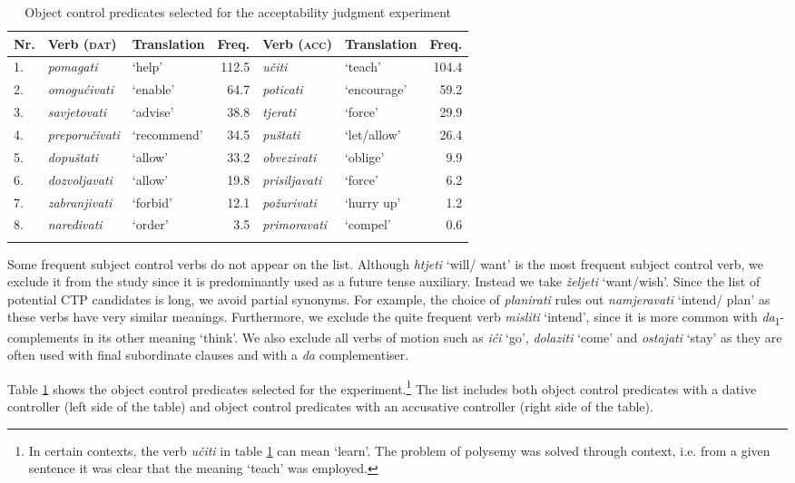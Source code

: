 \begin{table}[b]
\caption{Object control predicates selected for the acceptability judgment experiment\label{T16.3}}
\begin{tabular}{l@{~}llrllr}
\lsptoprule
Nr.&Verb (\textsc{dat})&Translation&Freq.&Verb (\textsc{acc})&Translation&Freq.\\\midrule
1. &\textit{pomagati}& ‘help’ &112.5& \textit{učiti} &‘teach’ & 104.4 \\
2. &\textit{omogućivati}& ‘enable’& 64.7& \textit{poticati}& ‘encourage’ &59.2 \\
3. &\textit{savjetovati}& ‘advise’& 38.8& \textit{tjerati} &‘force’& 29.9 \\
4. &\textit{preporučivati}& ‘recommend’& 34.5& \textit{puštati}& ‘let/allow’ &26.4 \\
5. &\textit{dopuštati}& ‘allow’ &33.2& \textit{obvezivati}& ‘oblige’& 9.9 \\
6. &\textit{dozvoljavati} &‘allow’& 19.8& \textit{prisiljavati} &‘force’ &6.2 \\
7. &\textit{zabranjivati}& ‘forbid’ &12.1 &\textit{požurivati}& ‘hurry up’ &1.2\\
8. &\textit{naređivati}& ‘order’& 3.5 &\textit{primoravati} &‘compel’ &0.6\\
\lspbottomrule
\end{tabular}
\end{table}

Some frequent subject control verbs do not appear on the list. Although \textit{htjeti} ‘will/ want’ is the most frequent subject control verb, we exclude it from the study since it is predominantly used as a future tense auxiliary. Instead we take \textit{željeti} ‘want/wish’. Since the list of potential CTP candidates is long, we avoid partial synonyms. For example, the choice of \textit{planirati} rules out \textit{namjeravati} ‘intend/ plan’ as these verbs have very similar meanings. Furthermore, we exclude the quite frequent verb \textit{misliti} ‘intend’, since it is more common with \textit{da}\textsubscript{1}-complements in its other meaning ‘think’. We also exclude all verbs of motion such as \textit{ići} ‘go’, \textit{dolaziti} ‘come’ and \textit{ostajati} ‘stay’ as they are often used with final subordinate clauses and with a \textit{da} complementiser. 

Table \ref{T16.3} shows the object control predicates selected for the experiment.\footnote{In certain contexts, the verb \textit{učiti} in table \ref{T16.3} can mean ‘learn’. The problem of polysemy was solved through context, i.e. from a given sentence it was clear that the meaning ‘teach’ was employed.} The list includes both object control predicates with a dative controller (left side of the table) and object control predicates with an accusative controller (right side of the table). 



